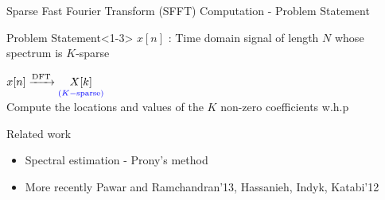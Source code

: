 \documentclass[10pt,xcolor=table]{beamer}
\begin{document}
	\begin{frame}{Sparse Fast Fourier Transform (SFFT) Computation - Problem Statement}
	
	 \begin{block}{Problem Statement}<1-3>
	 	\vspace{4pt}
	 	{\centering \alert{$x[n]$} : Time domain signal of length $N$ whose spectrum is $K$-sparse \\}
	\vspace{10pt} 	
	 	\centering	
	 	
	 {\large	$x[n]  \xrightarrow{\text{DFT}}  \underset{\color{blue}(K-\text{sparse})}{X[k]}$ \\}
	 	\vspace{10pt}
	 	Compute the {\alert{locations}} and \alert{values} of the $K$ non-zero coefficients w.h.p
	 \end{block}
	
	
	
	 {\begin{block}{Related work}
		\begin{itemize}
			\item Spectral estimation - Prony's method
			\item More recently Pawar and Ramchandran'13, Hassanieh, Indyk, Katabi'12
		\end{itemize}
	\end{block}}
	
	
	\end{frame}
\end{document}
